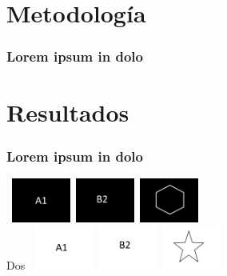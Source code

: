 \documentclass[aspectratio=169, xcolor=table]{beamer}
\begin{document}
\section{Metodología}

\begin{frame}\frametitle{Lorem ipsum in dolo}
  \lipsum[1]
\end{frame}

\section{Resultados}

\begin{frame}\frametitle{\textbf{Lorem ipsum} in dolo }
  
  \begin{center}
  
     \
    \includegraphics[width=0.145\textwidth]{./img/a1.png}\
    \includegraphics[width=0.145\textwidth]{./img/b2.png}\
    \includegraphics[width=0.145\textwidth]{./img/logo2.png}\\
    
    \rotatebox{90} {\footnotesize Dos} \
    \includegraphics[width=0.145\textwidth]{./img/a1-r.png}\
    \includegraphics[width=0.145\textwidth]{./img/b2-r.png}\
    \includegraphics[width=0.145\textwidth]{./img/logo1.png}\\
    
  \end{center}

\end{frame}
\end{document}
